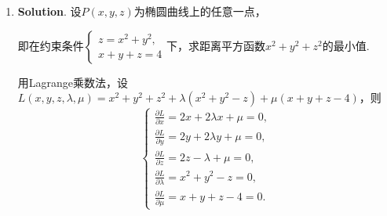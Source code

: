 \documentclass[../Main.tex]{subfiles}
\begin{document}
\begin{enumerate}
          解得$\begin{cases}
                  \frac{\mathrm{d}y}{\mathrm{d}x} = \frac{1-x}{y}, \\
                  \frac{\mathrm{d}z}{\mathrm{d}x} = -\frac{1}{z}
              \end{cases}$，所以法平面的法向量可取为$\sqrt{2}\left(1,\frac{\mathrm{d}y}{\mathrm{d}x}
              ,\frac{\mathrm{d}z}{\mathrm{d}x}\right)_{P}=\left(\sqrt{2},0,-1\right)$，

          法平面的方程为$\sqrt{2}\cdot(x-1)-0\cdot(y-1)+(-1)\cdot(z-\sqrt{2})=0$，即$\sqrt{2}
              x-z=0$.

          \textbf{法二}. $\nabla F = (2x,2y,2z)$，$\nabla G = (2(x-1),2y,0)$，

          取两个曲面的法向量分别为$\boldsymbol{n}_{F}= \frac{1}{2}\nabla F|_{P}= \left
              (1,1,\sqrt{2}\right)$，$\boldsymbol{n}_{G}= \frac{1}{2}\nabla G|_{P}= (0,1,
              0)$，

          所以法平面的法向量可取为$\boldsymbol{n}_{F}\times \boldsymbol{n}_{G}=
              \begin{vmatrix}
                  \boldsymbol{i} & \boldsymbol{j} & \boldsymbol{k} \\
                  1              & 1              & \sqrt{2}       \\
                  0              & 1              & 0
              \end{vmatrix}
              = \left(-\sqrt{2},0,1\right)$，

          法平面的方程为$-\sqrt{2}\cdot(x-1)-0\cdot(y-1)+1\cdot(z-\sqrt{2})=0$，即$\sqrt{2}
              x-z=0$.

    \item \textbf{Solution}. 设$P(x,y,z)$为椭圆曲线上的任意一点，

          即在约束条件$\begin{cases}
                  z=x^{2}+y^{2}, \\
                  x+y+z=4
              \end{cases}$下，求距离平方函数$x^{2}+y^{2}+z^{2}$的最小值.

          用Lagrange乘数法，设$L(x,y,z,\lambda,\mu) = x^{2}+y^{2}+z^{2} + \lambda(x^{2}
              +y^{2}-z) + \mu(x+y+z-4)$，则
          \[
              \begin{cases}
                  \frac{\partial L}{\partial x}= 2x + 2\lambda x + \mu = 0, \\[6pt]
                  \frac{\partial L}{\partial y}= 2y + 2\lambda y + \mu = 0, \\[6pt]
                  \frac{\partial L}{\partial z}= 2z - \lambda + \mu = 0,    \\[6pt]
                  \frac{\partial L}{\partial \lambda}= x^{2}+y^{2}-z = 0,   \\[6pt]
                  \frac{\partial L}{\partial \mu}= x+y+z-4 = 0.
              \end{cases}
          \]


\end{enumerate}
\end{document}
